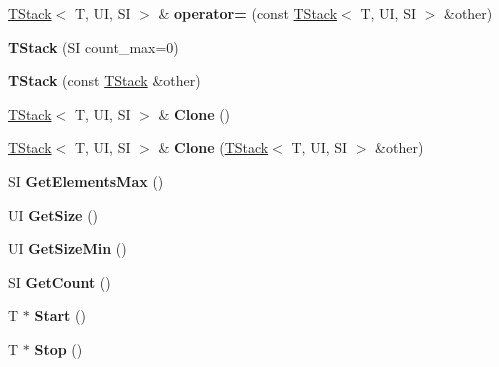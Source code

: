 \begin{DoxyCompactItemize}
\mbox{\hyperlink{class___1_1_t_stack}{T\+Stack}}$<$ T, UI, SI $>$ \& {\bfseries operator=} (const \mbox{\hyperlink{class___1_1_t_stack}{T\+Stack}}$<$ T, UI, SI $>$ \&other)
\item 
\mbox{\label{class___1_1_t_stack_a790c10c5af73eb3d910b1d075659a25d}} 
{\bfseries T\+Stack} (SI count\+\_\+max=0)
\item 
\mbox{\label{class___1_1_t_stack_a62baca70ce8f0d1b5e4bb555b7adf501}} 
{\bfseries T\+Stack} (const \mbox{\hyperlink{class___1_1_t_stack}{T\+Stack}} \&other)
\item 
\mbox{\label{class___1_1_t_stack_a8d68fc91698b66afab1036bb623fbc99}} 
\mbox{\hyperlink{class___1_1_t_stack}{T\+Stack}}$<$ T, UI, SI $>$ \& {\bfseries Clone} ()
\item 
\mbox{\label{class___1_1_t_stack_a9464f1b37ff222492b83a628ae47a6fa}} 
\mbox{\hyperlink{class___1_1_t_stack}{T\+Stack}}$<$ T, UI, SI $>$ \& {\bfseries Clone} (\mbox{\hyperlink{class___1_1_t_stack}{T\+Stack}}$<$ T, UI, SI $>$ \&other)
\item 
\mbox{\label{class___1_1_t_stack_ad74e57932cd860d645bd473ec79bf750}} 
SI {\bfseries Get\+Elements\+Max} ()
\item 
\mbox{\label{class___1_1_t_stack_aaecd85976fe80813c20d6d76d3102090}} 
UI {\bfseries Get\+Size} ()
\item 
\mbox{\label{class___1_1_t_stack_a151c919d282fd7b9327b24d0dceb0c93}} 
UI {\bfseries Get\+Size\+Min} ()
\item 
\mbox{\label{class___1_1_t_stack_afb3fff92b909c9b5bb0ba957edaba09f}} 
SI {\bfseries Get\+Count} ()
\item 
\mbox{\label{class___1_1_t_stack_a9cfef95b92ebd48ebfabf2958cca060a}} 
T $\ast$ {\bfseries Start} ()
\item 
\mbox{\label{class___1_1_t_stack_a38e6ab13bed770ddb5a92935eecf8be0}} 
T $\ast$ {\bfseries Stop} ()
\item 

\end{DoxyCompactItemize}

